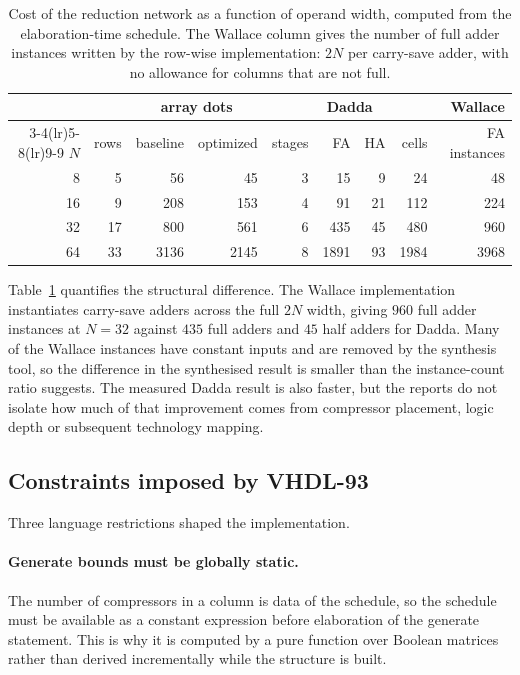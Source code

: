 \documentclass[11pt,a4paper]{article}
\begin{document}
\begin{table}[!ht]
\centering\small
\begin{tabular}{@{}rrrrrrrrr@{}}
\toprule
& & \multicolumn{2}{c}{\textbf{array dots}} & \multicolumn{4}{c}{\textbf{Dadda}} & \textbf{Wallace} \\
\cmidrule(lr){3-4}\cmidrule(lr){5-8}\cmidrule(lr){9-9}
$N$ & rows & baseline & optimized & stages & FA & HA & cells & FA instances \\
\midrule
 8 &  5 &   56 &   45 & 3 &   15 &  9 &   24 &   48 \\
16 &  9 &  208 &  153 & 4 &   91 & 21 &  112 &  224 \\
32 & 17 &  800 &  561 & 6 &  435 & 45 &  480 &  960 \\
64 & 33 & 3136 & 2145 & 8 & 1891 & 93 & 1984 & 3968 \\
\bottomrule
\end{tabular}
\caption{Cost of the reduction network as a function of operand width, computed
from the elaboration-time schedule. The Wallace column gives the number of full
adder instances written by the row-wise implementation: $2N$ per carry-save
adder, with no allowance for columns that are not full.}
\label{tab:generic}
\end{table}

Table~\ref{tab:generic} quantifies the structural difference. The Wallace
implementation instantiates carry-save adders across the full $2N$ width, giving
$960$ full adder instances at $N=32$ against $435$ full adders and $45$ half
adders for Dadda. Many of the Wallace instances have constant inputs and are
removed by the synthesis tool, so the difference in the synthesised result is
smaller than the instance-count ratio suggests. The measured Dadda result is
also faster, but the reports do not isolate how much of that improvement comes
from compressor placement, logic depth or subsequent technology mapping.

\subsection{Constraints imposed by VHDL-93}

Three language restrictions shaped the implementation.

\paragraph{Generate bounds must be globally static.} The number of compressors
in a column is data of the schedule, so the schedule must be available as a
constant expression before elaboration of the generate statement. This is why it
is computed by a pure function over Boolean matrices rather than derived
incrementally while the structure is built.
\end{document}
